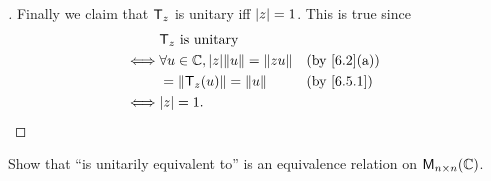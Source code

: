 \begin{proof}[]
  Finally we claim that \(\mathsf{T}_z\) is unitary iff \(\left\lvert z\right\rvert = 1\).
  This is true since
  \begin{align*}
         & \T_z \text{ is unitary}                                         \\
    \iff & \forall u \in \C, \abs{z} \norm{u} = \norm{zu} &  & \by{6.2}[a] \\
         & = \norm{\T_z(u)} = \norm{u}                    &  & \by{6.5.1}  \\
    \iff & \abs{z} = 1.
  \end{align*}
\end{proof}

\begin{ex}\label{ex:6.5.18}
  Show that ``is unitarily equivalent to'' is an equivalence relation on \(\ms[n][n][\C]\).
\end{ex}

